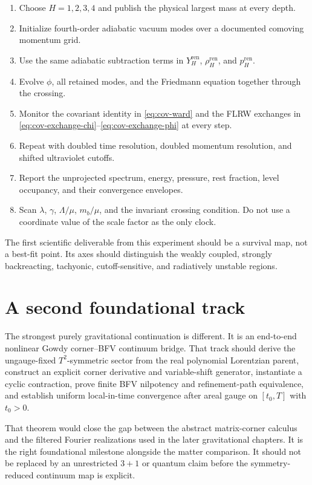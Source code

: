 \begin{enumerate}[leftmargin=2.2em]
\item Choose \(H=1,2,3,4\) and publish the physical largest mass at every depth.
\item Initialize fourth-order adiabatic vacuum modes over a documented comoving momentum grid.
\item Use the same adiabatic subtraction terms in \(Y_H^{\mathrm{ren}}\), \(\rho_H^{\mathrm{ren}}\), and \(p_H^{\mathrm{ren}}\).
\item Evolve \(\phi\), all retained modes, and the Friedmann equation together through the crossing.
\item Monitor the covariant identity in \eqref{eq:cov-ward} and the FLRW exchanges in \eqref{eq:cov-exchange-chi}--\eqref{eq:cov-exchange-phi} at every step.
\item Repeat with doubled time resolution, doubled momentum resolution, and shifted ultraviolet cutoffs.
\item Report the unprojected spectrum, energy, pressure, rest fraction, level occupancy, and their convergence envelopes.
\item Scan \(\lambda\), \(\gamma\), \(\Lambda/\mu\), \(m_b/\mu\), and the invariant crossing condition.  Do not use a coordinate value of the scale factor as the only clock.
\end{enumerate}

The first scientific deliverable from this experiment should be a survival map, not a best-fit point.  Its axes should distinguish the weakly coupled, strongly backreacting, tachyonic, cutoff-sensitive, and radiatively unstable regions.

\section{A second foundational track}

The strongest purely gravitational continuation is different.  It is an end-to-end nonlinear Gowdy corner--BFV continuum bridge.  That track should derive the ungauge-fixed \(T^2\)-symmetric sector from the real polynomial Lorentzian parent, construct an explicit corner derivative and variable-shift generator, instantiate a cyclic contraction, prove finite BFV nilpotency and refinement-path equivalence, and establish uniform local-in-time convergence after areal gauge on \([t_0,T]\) with \(t_0>0\).

That theorem would close the gap between the abstract matrix-corner calculus and the filtered Fourier realizations used in the later gravitational chapters.  It is the right foundational milestone alongside the matter comparison.  It should not be replaced by an unrestricted \(3+1\) or quantum claim before the symmetry-reduced continuum map is explicit.

